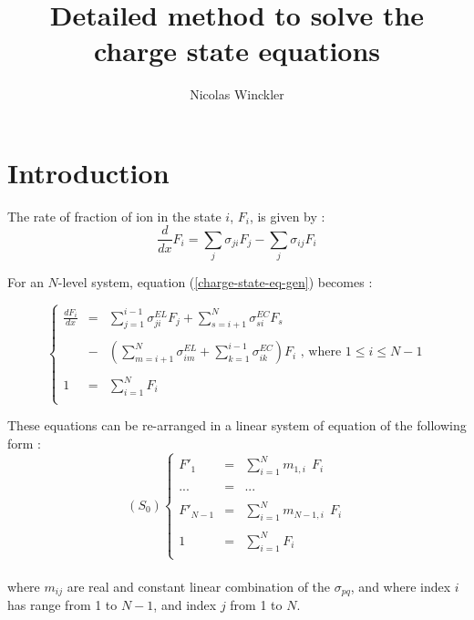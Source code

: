 \documentclass[a4paper,12pt]{article}
\title{Detailed method to solve the charge state equations}
\author{Nicolas Winckler}
\begin{document}
\maketitle


\section{Introduction}

The rate of fraction of ion in the state $i$, $F_i$, is given by :
\begin{equation}
\frac{d}{dx}F_i = \sum_j \sigma_{ji} F_j - \sum_j \sigma_{ij} F_i
\label{charge-state-eq-gen}
\end{equation}

For an $N$-level system, equation (\ref{charge-state-eq-gen}) becomes :

\begin{equation}
\left\lbrace
\begin{array}{lcl}
\frac{dF_i}{dx}&=& \sum_{j=1}^{i-1} \sigma_{ji}^{EL} F_j  + \sum_{s=i+1}^N  \sigma_{si}^{EC} F_s   \\
 & & \\
 & - &   \left( \sum_{m=i+1}^{N} \sigma_{im}^{EL} +\sum_{k=1}^{i-1} \sigma_{ik}^{EC} \right) F_i \text{ , where } 1\leq i \leq N-1\\
 & & \\
1 &=&\sum_{i=1}^N F_i\\
\end{array}\right.
\end{equation}

These equations can be re-arranged in a linear system of equation of the following form :
\\ 

$$(S_0)\left\lbrace
\begin{array}{lcl}
F'_1&=& \sum_{i=1}^N m_{1,i} \ \ F_i  \\
 & & \\
... &=& ...\\
 & & \\
F'_{N-1} &=& \sum_{i=1}^N m_{N-1,i} \ \ F_i \\
 & & \\
1 &=&\sum_{i=1}^N F_i\\
\end{array}\right.$$
\\
where $m_{ij}$ are real and constant linear combination of the $\sigma_{pq}$, and where index $i$ has range from 1 to $N-1$, and index $j$ from 1 to $N$. 
\end{document}
